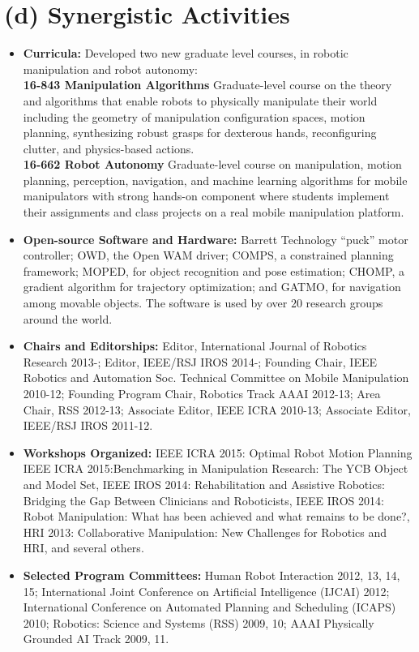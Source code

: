 \documentclass[10pt]{article}
\begin{document}
\section{(d) Synergistic Activities}
\begin{itemize}
\addtolength{\itemsep}{-0.5\baselineskip}
\item \textbf{Curricula:} Developed two new graduate level courses, in robotic manipulation and robot autonomy: \\
\textbf{16-843 Manipulation Algorithms} Graduate-level course on the theory and algorithms that enable robots to physically manipulate their world including the geometry of manipulation configuration spaces, motion planning, synthesizing robust grasps for dexterous hands, reconfiguring clutter, and physics-based actions.\\
\textbf{16-662 Robot Autonomy}
Graduate-level course on manipulation, motion planning, perception, navigation,
and machine learning algorithms for mobile manipulators with strong hands-on component where students implement their assignments and class projects on a real mobile manipulation platform.
\item \textbf{Open-source Software and Hardware:}
Barrett Technology ``puck'' motor controller; OWD, the Open WAM driver; COMPS, a constrained planning framework; MOPED, for object recognition and pose estimation; CHOMP, a gradient algorithm for trajectory optimization; and GATMO, for navigation among movable objects. The software is used by over $20$ research groups around the world. 
\item \textbf{Chairs and Editorships:}
Editor, International Journal of Robotics Research 2013-;
Editor, IEEE/RSJ IROS 2014-;
Founding Chair, IEEE Robotics and Automation Soc. Technical Committee on Mobile Manipulation 2010-12;
Founding Program Chair, Robotics Track AAAI 2012-13;
Area Chair, RSS 2012-13;
Associate Editor, IEEE ICRA 2010-13;
Associate Editor, IEEE/RSJ IROS 2011-12.
\item \textbf{Workshops Organized:} 
IEEE ICRA 2015: Optimal Robot Motion Planning
IEEE ICRA 2015:Benchmarking in Manipulation Research: The YCB Object and Model Set,
IEEE IROS 2014: Rehabilitation and Assistive Robotics: Bridging the Gap Between Clinicians and Roboticists,
IEEE IROS 2014: Robot Manipulation: What has been achieved and what remains to be done?,
HRI 2013: Collaborative Manipulation: New Challenges for Robotics and HRI,
and several others.
\item \textbf{Selected Program Committees:} 
Human Robot Interaction 2012, 13, 14, 15;
International Joint Conference on Artificial Intelligence (IJCAI) 2012;
International Conference on Automated Planning and Scheduling (ICAPS) 2010;
Robotics: Science and Systems (RSS) 2009, 10; 
AAAI Physically Grounded AI Track 2009, 11.
\end{itemize}
\end{document}

